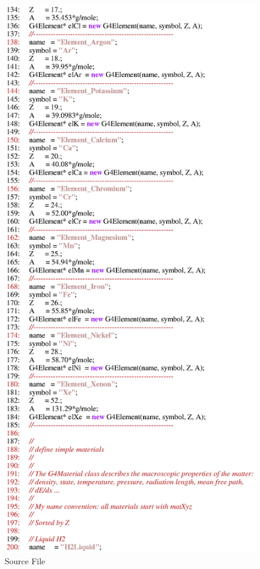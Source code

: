 \begin{figure}[h]
  \hspace{0cm}
  \includegraphics[scale=0.8]{./figures17/QweakSimMaterial.cc-p3.eps}
  \caption{\label{SourceXVII4} Source File}
           \label{fig:XVII-SC-4}
\end{figure}
\clearpage

